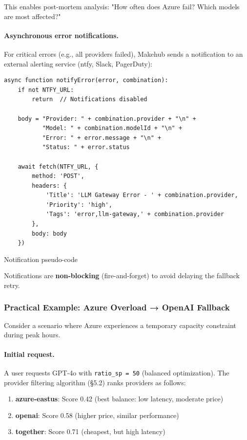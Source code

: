\documentclass[english]{article}
\begin{document}
This enables post-mortem analysis: "How often does Azure fail? Which models are most affected?"

\paragraph{Asynchronous error notifications.}

For critical errors (e.g., all providers failed), Makehub sends a notification to an external alerting service (ntfy, Slack, PagerDuty):

\begin{listing}[H]
\begin{verbatim}
async function notifyError(error, combination):
    if not NTFY_URL:
        return  // Notifications disabled

    body = "Provider: " + combination.provider + "\n" +
           "Model: " + combination.modelId + "\n" +
           "Error: " + error.message + "\n" +
           "Status: " + error.status

    await fetch(NTFY_URL, {
        method: 'POST',
        headers: {
            'Title': 'LLM Gateway Error - ' + combination.provider,
            'Priority': 'high',
            'Tags': 'error,llm-gateway,' + combination.provider
        },
        body: body
    })
\end{verbatim}
\caption{Notification pseudo-code}
\end{listing}

Notifications are \textbf{non-blocking} (fire-and-forget) to avoid delaying the fallback retry.

\subsubsection{Practical Example: Azure Overload → OpenAI Fallback}

Consider a scenario where Azure experiences a temporary capacity constraint during peak hours.

\paragraph{Initial request.}

A user requests GPT-4o with \texttt{ratio\_sp = 50} (balanced optimization). The provider filtering algorithm (§5.2) ranks providers as follows:

\begin{enumerate}
    \item \textbf{azure-eastus}: Score 0.42 (best balance: low latency, moderate price)
    \item \textbf{openai}: Score 0.58 (higher price, similar performance)
    \item \textbf{together}: Score 0.71 (cheapest, but high latency)
\end{enumerate}
\end{document}
